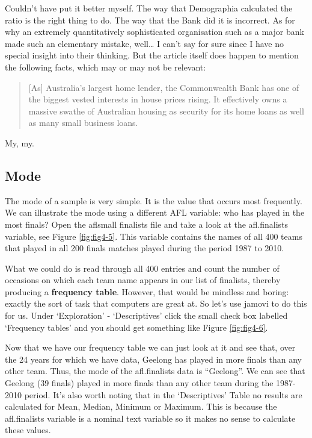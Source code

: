 \documentclass[
]{book}
\begin{document}
Couldn't have put it better myself. The way that Demographia calculated the ratio is the right thing to do. The way that the Bank did it is incorrect. As for why an extremely quantitatively sophisticated organisation such as a major bank made such an elementary mistake, well\ldots{} I can't say for sure since I have no special insight into their thinking. But the article itself does happen to mention the following facts, which may or may not be relevant:

\begin{quote}
{[}As{]} Australia's largest home lender, the Commonwealth Bank has one of the biggest vested interests in house prices rising. It effectively owns a massive swathe of Australian housing as security for its home loans as well as many small business loans.
\end{quote}

My, my.

\hypertarget{mode}{%
\subsection{Mode}\label{mode}}

The mode of a sample is very simple. It is the value that occurs most frequently. We can illustrate the mode using a different AFL variable: who has played in the most finals? Open the aflsmall finalists file and take a look at the afl.finalists variable, see Figure \ref{fig:fig4-5}. This variable contains the names of all 400 teams that played in all 200 finals matches played during the period 1987 to 2010.

What we could do is read through all 400 entries and count the number of occasions on which each team name appears in our list of finalists, thereby producing a \textbf{frequency table}. However, that would be mindless and boring: exactly the sort of task that computers are great at. So let's use jamovi to do this for us. Under `Exploration' - `Descriptives' click the small check box labelled `Frequency tables' and you should get something like Figure \ref{fig:fig4-6}.

Now that we have our frequency table we can just look at it and see that, over the 24 years for which we have data, Geelong has played in more finals than any other team. Thus, the mode of the afl.finalists data is ``Geelong''. We can see that Geelong (39 finals) played in more finals than any other team during the 1987-2010 period. It's also worth noting that in the `Descriptives' Table no results are calculated for Mean, Median, Minimum or Maximum. This is because the afl.finalists variable is a nominal text variable so it makes no sense to calculate these values.
\end{document}
